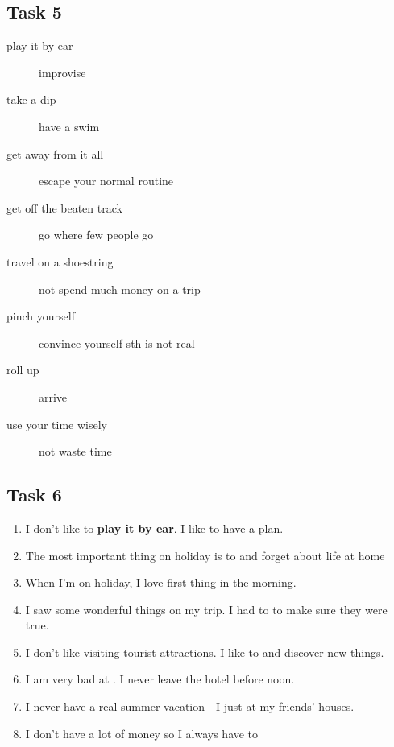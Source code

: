 \documentclass[a4paper]{article}
\begin{document}
\subsection*{Task 5}
\begin{description}
    \item[play it by ear] improvise
    \item[take a dip] have a swim
    \item[get away from it all] escape your normal routine
    \item[get off the beaten track] go where few people go
    \item[travel on a shoestring] not spend much money on a trip
    \item[pinch yourself] convince yourself sth is not real
    \item[roll up] arrive
    \item[use your time wisely] not waste time
\end{description}
\subsection*{Task 6}
\begin{enumerate}
    \item I don't like to \textbf{play it by ear}. I like to have a plan.
    \item The most important thing on holiday is to \textbf{} and forget about life at home
    \item When I'm on holiday, I love \textbf{} first thing in the morning.
    \item I saw some wonderful things on my trip. I had to \textbf{} to make sure they were true.
    \item I don't like visiting tourist attractions. I like to \textbf{} and discover new things.
    \item I am very bad at \textbf{}. I never leave the hotel before noon.
    \item I never have a real summer vacation - I just \textbf{} at my friends' houses.
    \item I don't have a lot of money so I always have to \textbf{}
\end{enumerate}
\end{document}
